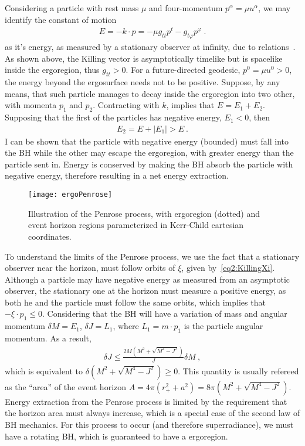 Considering a particle with rest mass $\mu$ and four-momentum $p^\alpha = \mu u^\alpha$, we may identify the constant of motion 
\begin{align}
    E = - k \cdot p = -\mu g_{tt} p^t - g_{t\varphi} p^\varphi  ~.
    \label{eq2:PenroseE0}
\end{align}
as it's energy, as measured by a stationary observer at infinity, due to relations~. As shown above, the Killing vector is asymptotically timelike but is spacelike inside the ergoregion, thus $g_{tt}>0$. For a future-directed geodesic, $p^0 = \mu u^0 >0$, the energy beyond the ergosurface needs not to be positive. Suppose, by any means, that such particle manages to decay inside the ergoregion into two other, with momenta $p_1$ and $p_2$. Contracting with $k$, implies that $E = E_1+E_2$. Supposing that the first of the particles has negative energy, $E_1<0$, then 
\begin{align}
    E_2 = E + |E_1| > E ~.
    \label{eq2:PenroseE0}
\end{align}
I can be shown that the particle with negative energy (bounded) must fall into the BH while the other may escape the ergoregion, with greater energy than the particle sent in. Energy is conserved by making the BH absorb the particle with negative energy, therefore resulting in a net energy extraction.

\begin{figure}[h]
    \centering
    \vspace{0.5cm}
    \texttt{[image: ergoPenrose]}
    \caption{Illustration of the Penrose process, with ergoregion (dotted) and event horizon regions parameterized in Kerr-Child cartesian coordinates.}
    \label{fig2:penroseProcess}
\end{figure}

To understand the limits of the Penrose process, we use the fact that a stationary observer near the horizon, must follow orbits of $\xi$, given by~\eqref{eq2:KillingXi}. 
Although a particle may have negative energy as measured from an asymptotic observer, the stationary one at the horizon must measure a positive energy, as both he and the particle must follow the same orbits, which implies that $-\xi \cdot  p_1 \le 0$. Considering that the BH will have a variation of mass and angular momentum $\delta M =E_1$, $\delta J = L_1$, where $L_1 = m \cdot p_1$ is the particle angular momentum. As a result,
\begin{align}
    \delta J \le \frac{2M\left(M^2+\sqrt{M^4-J^2}\right)}{J} \delta M ~,
\end{align}
which is equivalent to $\delta \left(M^2+\sqrt{M^4-J^2}\right) \ge 0$. This quantity is usually refereed as the ``area'' of the event horizon $A=4\pi(r_+^2+a^2)=8\pi\left(M^2+\sqrt{M^4-J^2}\right)$. Energy extraction from the Penrose process is limited by the requirement that the horizon area must always increase, which is a special case of the second law of BH mechanics. For this process to occur (and therefore superradiance), we must have a rotating BH, which is guaranteed to have a ergoregion. 

